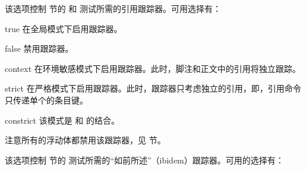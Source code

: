 \begin{optionlist}

该选项控制  节的  和  测试所需的引用跟踪器。可用选择有：

\begin{valuelist}
\item[true] %
在全局模式下启用跟踪器。
\item[false] %
禁用跟踪器。
\item[context] %
在环境敏感模式下启用跟踪器。此时，脚注和正文中的引用将独立跟踪。
\item[strict] %
在严格模式下启用跟踪器。此时，跟踪器只考虑独立的引用，即，引用命令只传递单个的条目键。
\item[constrict] %
该模式是  和  的结合。
\end{valuelist}

注意所有的浮动体都禁用该跟踪器，见  节。



该选项控制  节的  测试所需的“如前所述”（ibidem）跟踪器。可用的选择有：


\end{optionlist}
